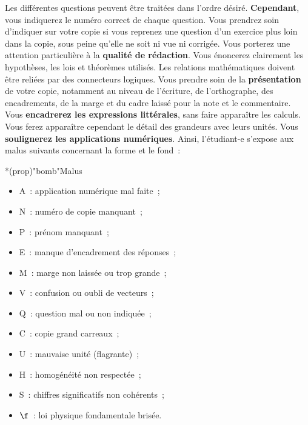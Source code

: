 \documentclass[a4paper, 12pt, garamond]{book}
\begin{document}
{Les différentes questions peuvent être traitées dans l'ordre désiré.
\textbf{Cependant}, vous indiquerez le numéro correct de chaque question. Vous
prendrez soin d'indiquer sur votre copie si vous reprenez une question d'un
exercice plus loin dans la copie, sous peine qu'elle ne soit ni vue ni
corrigée.
\bigbreak
Vous porterez une attention particulière à la \textbf{qualité de rédaction}.
Vous énoncerez clairement les hypothèses, les lois et théorèmes utilisés. Les
relations mathématiques doivent être reliées par des connecteurs logiques.
\bigbreak
Vous prendre soin de la \textbf{présentation} de votre copie, notamment au
niveau de l'écriture, de l'orthographe, des encadrements, de la marge et du
cadre laissé pour la note et le commentaire. Vous \textbf{encadrerez les
	expressions littérales}, sans faire apparaître les calculs. Vous ferez
apparaître cependant le détail des grandeurs avec leurs unités. Vous
\textbf{soulignerez les applications numériques}.
\bigbreak
Ainsi, l'étudiant-e s'expose aux malus suivants concernant la forme et le
fond~:
\begin{tcn}*(prop)"bomb"{Malus}
	\begin{minipage}[t]{0.50\linewidth}
		\begin{itemize}
			\item A~: application numérique mal faite~;
			\item N~: numéro de copie manquant~;
			\item P~: prénom manquant~;
			\item E~: manque d'encadrement des réponses~;
			\item M~: marge non laissée ou trop grande~;
			\item V~: confusion ou oubli de vecteurs~;
		\end{itemize}
	\end{minipage}
	\begin{minipage}[t]{0.50\linewidth}
		\begin{itemize}
			\item Q~: question mal ou non indiquée~;
			\item C~: copie grand carreaux~;
			\item U~: mauvaise unité (flagrante)~;
			\item H~: homogénéité non respectée~;
			\item S~: chiffres significatifs non cohérents~;
			\item $\f$~: loi physique fondamentale brisée.
		\end{itemize}
	\end{minipage}
\end{tcn}

}
\end{document}
